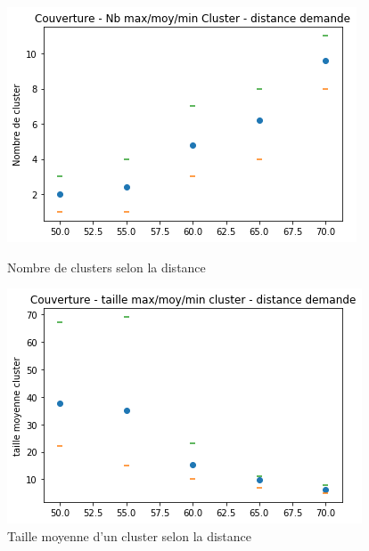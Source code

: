 \documentclass[a4paper]{article}
\begin{document}
\begin{figure}[h]
	\begin{minipage}[c]{.46\linewidth}
		\centering
		\includegraphics[width=1.1\linewidth]{../../script_results/Couverture_taille_cluster_groupe.png}
		\caption{Nombre de clusters selon la distance}
	\end{minipage}
	\hfill%
	\begin{minipage}[c]{.46\linewidth}
		\centering
		\includegraphics[width=1.1\linewidth]{../../script_results/Couverture_average_robot_groupe.png}
		\caption{Taille moyenne d'un cluster selon la distance}
	\end{minipage}
\end{figure}
\end{document}

